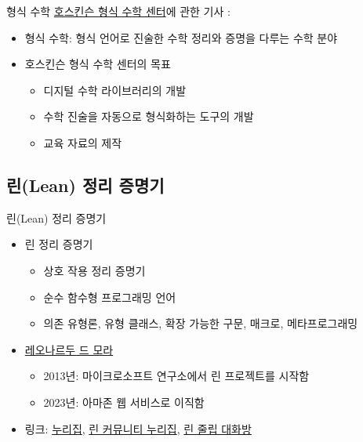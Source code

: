 \documentclass{beamer}
\begin{document}
\begin{frame}{형식 수학}
  \href{https://www.cmu.edu/hoskinson/index.html}{호스킨슨 형식 수학 센터}에
  관한 기사 \autocite{hoskinson}:
  \begin{itemize}
    \item 형식 수학: 형식 언어로 진술한 수학 정리와 증명을 다루는 수학 분야
    \item 호스킨슨 형식 수학 센터의 목표
    \begin{itemize}
      \item 디지털 수학 라이브러리의 개발
      \item 수학 진술을 자동으로 형식화하는 도구의 개발
      \item 교육 자료의 제작
    \end{itemize}
  \end{itemize}
\end{frame}

\subsection{린(Lean) 정리 증명기}

\begin{frame}{린(Lean) 정리 증명기}
  \begin{itemize}
    \item 린 정리 증명기
    \begin{itemize}
      \item 상호 작용 정리 증명기
      \item 순수 함수형 프로그래밍 언어
      \item 의존 유형론, 유형 클래스, 확장 가능한 구문, 매크로, 메타프로그래밍
    \end{itemize}
    \item \href{https://leodemoura.github.io/}{레오나르두 드 모라}
    \begin{itemize}
      \item 2013년: 마이크로소프트 연구소에서 린 프로젝트를 시작함
      \item 2023년: 아마존 웹 서비스로 이직함
    \end{itemize}
    \item 링크:
      \href{https://leanprover.github.io/}{누리집},
      \href{https://leanprover-community.github.io/index.html}{린 커뮤니티
        누리집},
      \href{https://leanprover.zulipchat.com/}{린 줄립 대화방}
  \end{itemize}
\end{frame}
\end{document}
